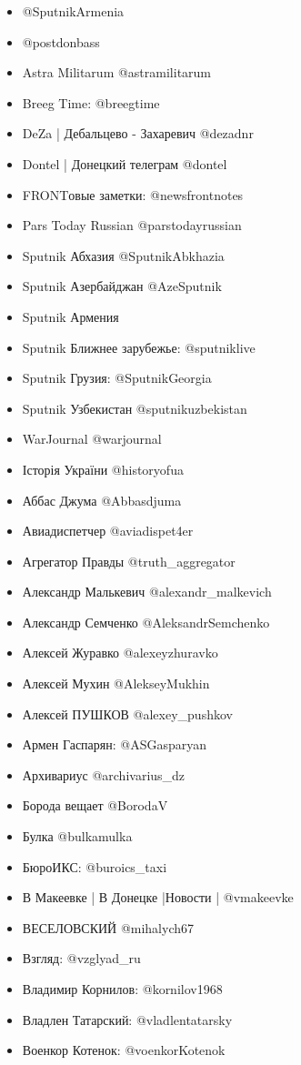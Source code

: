 \begin{itemize}
\item @SputnikArmenia
\item @postdonbass 
\item Astra Militarum @astramilitarum
\item Breeg Time: @breegtime
\item DeZa | Дебальцево - Захаревич @dezadnr
\item Dontel | Донецкий телеграм @dontel 
\item FRONTовые заметки: @newsfrontnotes
\item Pars Today Russian @parstodayrussian 
\item Sputnik Абхазия @SputnikAbkhazia
\item Sputnik Азербайджан @AzeSputnik
\item Sputnik Армения 
\item Sputnik Ближнее зарубежье: @sputniklive
\item Sputnik Грузия: @SputnikGeorgia
\item Sputnik Узбекистан @sputnikuzbekistan
\item WarJournal @warjournal
\item Історія України @historyofua
\item Аббас Джума @Abbasdjuma
\item Авиадиспетчер @aviadispet4er 
\item Агрегатор Правды @truth\_aggregator
\item Александр Малькевич @alexandr\_malkevich 
\item Александр Семченко @AleksandrSemchenko
\item Алексей Журавко @alexeyzhuravko
\item Алексей Мухин @AlekseyMukhin
\item Алексей ПУШКОВ @alexey\_pushkov
\item Армен Гаспарян: @ASGasparyan
\item Архивариус @archivarius\_dz
\item Борода вещает @BorodaV
\item Булка @bulkamulka
\item БюроИКС: @buroics\_taxi
\item В Макеевке | В Донецке |Новости | @vmakeevke
\item ВЕСЕЛОВСКИЙ @mihalych67
\item Взгляд: @vzglyad\_ru
\item Владимир Корнилов: @kornilov1968 
\item Владлен Татарский: @vladlentatarsky 
\item Военкор Котенок: @voenkorKotenok

\end{itemize}

